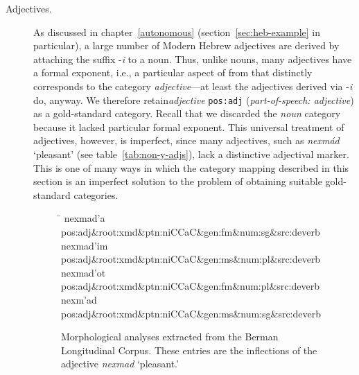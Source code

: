 \begin{description}
\item[Adjectives.]
As discussed in chapter~\ref{autonomous} (section~\ref{sec:heb-example} in particular), 
a large number of Modern Hebrew adjectives are derived by attaching the 
suffix -\textit{i}
to a noun. Thus, unlike nouns, many adjectives have a formal exponent, i.e., a particular aspect of from that distinctly corresponds to the category \emph{adjective}---at least the adjectives derived via -\textit{i} do, anyway. 
We therefore retain\emph{adjective} 
\texttt{pos:adj} (\textit{part-of-speech: adjective}) as a gold-standard category.
Recall that we discarded the \emph{noun} category because it lacked particular formal exponent. 
This universal treatment of adjectives, however, is imperfect, since many adjectives, such as
\textit{nexm\'{a}d} `pleasant' (see table~\ref{tab:non-y-adjs}),
lack a distinctive adjectival marker.  This is one of many ways in which the category mapping described in this section is an imperfect solution to the problem of obtaining suitable gold-standard categories.  
 
\begin{figure}[t]
\begin{mdframed}
\begin{tabbing}
\hspace{1in} \= \hspace{5.5in} \kill
nexmad\a'{a} \> pos:adj\&root:xmd\&ptn:niCCaC\&gen:fm\&num:sg\&src:deverb\\
nexmad\a'{i}m \> pos:adj\&root:xmd\&ptn:niCCaC\&gen:ms\&num:pl\&src:deverb\\
nexmad\a'{o}t \> pos:adj\&root:xmd\&ptn:niCCaC\&gen:fm\&num:pl\&src:deverb\\
nexm\a'{a}d \> pos:adj\&root:xmd\&ptn:niCCaC\&gen:ms\&num:sg\&src:deverb\\
\end{tabbing}
\caption{Morphological analyses extracted from the Berman Longitudinal Corpus. These entries are the inflections
of the adjective \textit{nexmad} `pleasant.'}
\label{fig:analyses}
\end{mdframed}
\end{figure}


\end{description}
